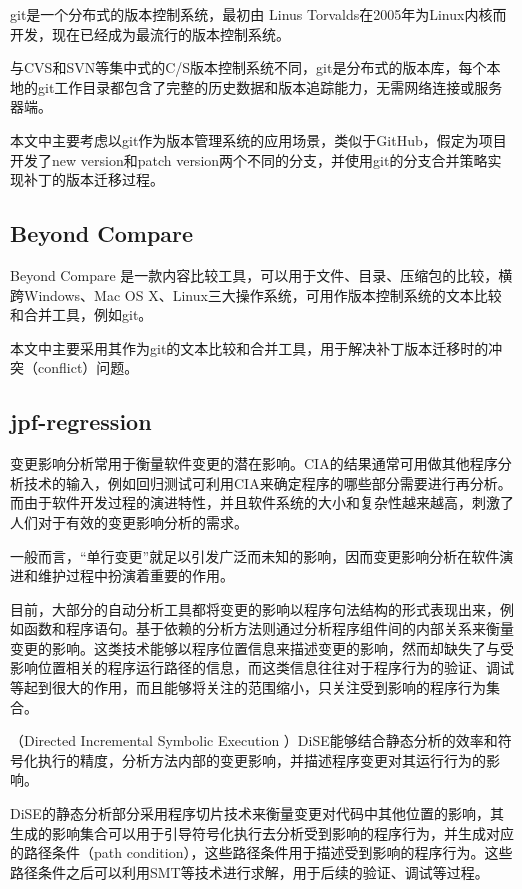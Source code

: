 git是一个分布式的版本控制系统，最初由 Linus Torvalds在2005年为Linux内核而开发，现在已经成为最流行的版本控制系统。

与CVS和SVN等集中式的C/S版本控制系统不同，git是分布式的版本库，每个本地的git工作目录都包含了完整的历史数据和版本追踪能力，无需网络连接或服务器端。
      

本文中主要考虑以git作为版本管理系统的应用场景，类似于GitHub，假定为项目开发了new version和patch version两个不同的分支，并使用git的分支合并策略实现补丁的版本迁移过程。
	\subsection{Beyond Compare}
		
Beyond Compare 是一款内容比较工具，可以用于文件、目录、压缩包的比较，横跨Windows、Mac OS X、Linux三大操作系统，可用作版本控制系统的文本比较和合并工具，例如git。
      
本文中主要采用其作为git的文本比较和合并工具，用于解决补丁版本迁移时的冲突（conflict）问题。


	\subsection{jpf-regression} 
变更影响分析常用于衡量软件变更的潜在影响。CIA的结果通常可用做其他程序分析技术的输入，例如回归测试可利用CIA来确定程序的哪些部分需要进行再分析。而由于软件开发过程的演进特性，并且软件系统的大小和复杂性越来越高，刺激了人们对于有效的变更影响分析的需求。

一般而言，“单行变更”就足以引发广泛而未知的影响，因而变更影响分析在软件演进和维护过程中扮演着重要的作用。

目前，大部分的自动分析工具都将变更的影响以程序句法结构的形式表现出来，例如函数和程序语句。基于依赖的分析方法则通过分析程序组件间的内部关系来衡量变更的影响。这类技术能够以程序位置信息来描述变更的影响，然而却缺失了与受影响位置相关的程序运行路径的信息，而这类信息往往对于程序行为的验证、调试等起到很大的作用，而且能够将关注的范围缩小，只关注受到影响的程序行为集合。

（Directed Incremental Symbolic Execution ）DiSE能够结合静态分析的效率和符号化执行的精度，分析方法内部的变更影响，并描述程序变更对其运行行为的影响。

DiSE的静态分析部分采用程序切片技术来衡量变更对代码中其他位置的影响，其生成的影响集合可以用于引导符号化执行去分析受到影响的程序行为，并生成对应的路径条件（path condition），这些路径条件用于描述受到影响的程序行为。这些路径条件之后可以利用SMT等技术进行求解，用于后续的验证、调试等过程。

